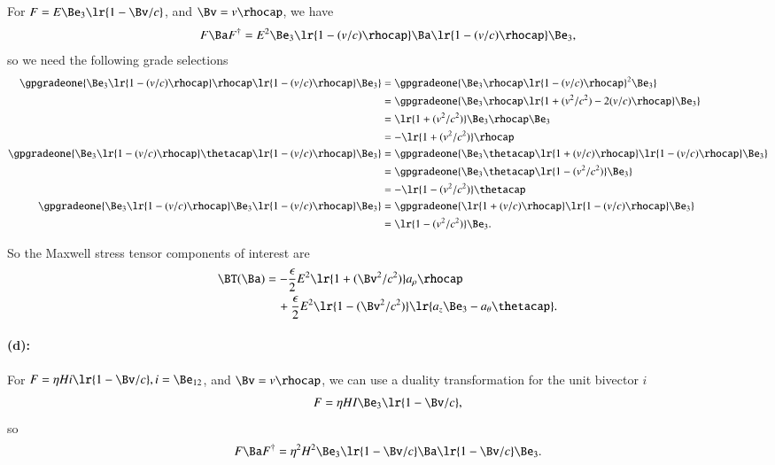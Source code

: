 For \( F = E \Be_3 \lr{ 1 - \Bv/c } \), and \( \Bv = v \rhocap \), we have
\begin{dmath}\label{eqn:poyntingStaticExamples:1220}
F \Ba F^\dagger
=
E^2 \Be_3 \lr{ 1 - (v/c) \rhocap } \Ba \lr{ 1 - (v/c) \rhocap } \Be_3,
\end{dmath}
so we need the following grade selections
\begin{equation}\label{eqn:poyntingStaticExamples:1260}
\begin{aligned}
\gpgradeone{ \Be_3 \lr{ 1 - (v/c) \rhocap } \rhocap \lr{ 1 - (v/c) \rhocap } \Be_3 }
&=
\gpgradeone{ \Be_3 \rhocap \lr{ 1 - (v/c) \rhocap }^2 \Be_3 } \\
&=
\gpgradeone{ \Be_3 \rhocap \lr{ 1 + (v^2/c^2) - 2 (v/c) \rhocap } \Be_3 } \\
&=
\lr{ 1 + (v^2/c^2) } \Be_3 \rhocap \Be_3 \\
&=
-\lr{ 1 + (v^2/c^2) } \rhocap \\
\gpgradeone{ \Be_3 \lr{ 1 - (v/c) \rhocap } \thetacap \lr{ 1 - (v/c) \rhocap } \Be_3 }
&=
\gpgradeone{ \Be_3 \thetacap \lr{ 1 + (v/c) \rhocap } \lr{ 1 - (v/c) \rhocap } \Be_3 } \\
&=
\gpgradeone{ \Be_3 \thetacap \lr{ 1 - (v^2/c^2) } \Be_3 } \\
&=
-\lr{ 1 - (v^2/c^2) } \thetacap \\
\gpgradeone{ \Be_3 \lr{ 1 - (v/c) \rhocap } \Be_3 \lr{ 1 - (v/c) \rhocap } \Be_3 }
&=
\gpgradeone{ \lr{ 1 + (v/c) \rhocap } \lr{ 1 - (v/c) \rhocap } \Be_3 } \\
&=
\lr{ 1 - (v^2/c^2) } \Be_3.
\end{aligned}
\end{equation}

So the Maxwell stress tensor components of interest are
\begin{dmath}\label{eqn:poyntingStaticExamples:1320}
\begin{aligned}
\BT(\Ba)
&=
-\frac{\epsilon}{2} E^2 \lr{ 1 + (\Bv^2/c^2) } a_\rho \rhocap \\
&\quad +
\frac{\epsilon}{2} E^2 \lr{ 1 - (\Bv^2/c^2) } \lr{ a_z \Be_3 - a_\theta \thetacap }.
\end{aligned}
\end{dmath}

\paragraph{(d):}

For \( F = \eta H i \lr{ 1 - \Bv/c }, i = \Be_{12} \), and \( \Bv = v \rhocap \), we can use a duality transformation for the unit bivector \( i \)
\begin{dmath}\label{eqn:poyntingStaticExamples:1340}
F = \eta H I \Be_3 \lr{ 1 - \Bv/c },
\end{dmath}
so
\begin{dmath}\label{eqn:poyntingStaticExamples:1360}
F \Ba F^\dagger = \eta^2 H^2 \Be_3 \lr{ 1 - \Bv/c } \Ba \lr{ 1 - \Bv/c } \Be_3.
\end{dmath}

